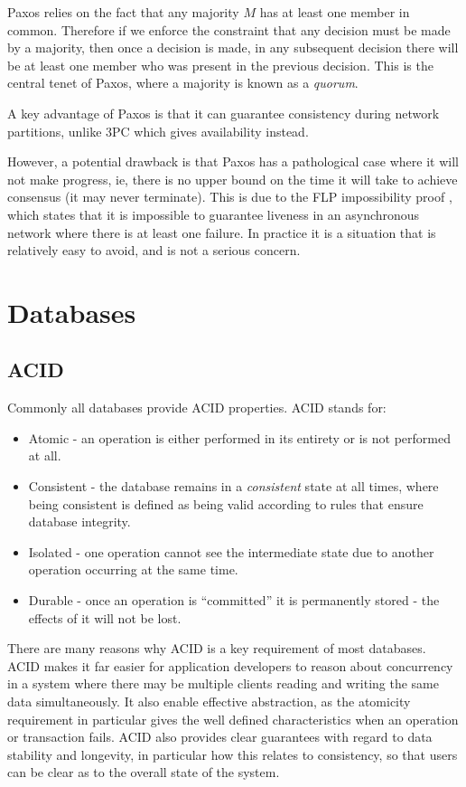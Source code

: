 \documentclass[12pt,twoside,notitlepage]{report}
\begin{document}
Paxos relies on the fact that any majority $M$ has at least one member in common. Therefore if we
enforce the constraint that any decision must be made by a majority, then once a decision is made,
in any subsequent decision there will be at least one member who was present in the previous
decision. This is the central tenet of Paxos, where a majority is known as a \emph{quorum}.

A key advantage of Paxos is that it can guarantee consistency during network partitions,
unlike 3PC which gives availability instead.

However, a potential drawback is that Paxos has a pathological case where it will not make
progress, ie, there is no upper bound on the time it will take to achieve consensus (it may never
terminate). This is due to the FLP impossibility proof \cite{fischer85}, which states that it is
impossible to guarantee liveness in an asynchronous network where there is at least one failure.
In practice it is a situation that is relatively easy to avoid, and is not a serious concern.

\section{Databases}

\subsection*{ACID}

Commonly all databases provide ACID properties. ACID stands for:

\begin{itemize}
\item Atomic - an operation is either performed in its entirety or is not performed at all.
\item Consistent - the database remains in a \emph{consistent} state at all times, where being
	consistent is defined as being valid according to rules that ensure database integrity.
\item Isolated - one operation cannot see the intermediate state due to another operation occurring
	at the same time.
\item Durable - once an operation is ``committed'' it is permanently stored - the effects of it will
	not be lost.
\end{itemize}

There are many reasons why ACID is a key requirement of most databases. ACID makes it far easier
for application developers to reason about concurrency in a system where there may be multiple
clients reading and writing the same data simultaneously. It also enable effective abstraction, as
the atomicity requirement in particular gives the well defined characteristics when an operation
or transaction fails. ACID also provides clear guarantees with regard to data stability and
longevity, in particular how this relates to consistency, so that users can be clear as to the
overall state of the system.
\end{document}
